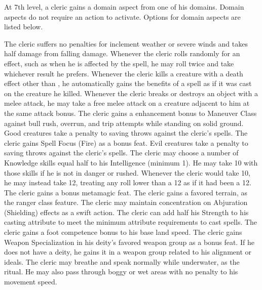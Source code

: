  At 7th level, a cleric gains a domain aspect from one of his domains. Domain aspects do not require an action to activate. Options for domain aspects are listed below.

 The cleric suffers no penalties for inclement weather or severe winds and takes half damage from falling damage.
 Whenever the cleric rolls randomly for an effect, such as when he is affected by the  spell, he may roll twice and take whichever result he prefers.
 Whenever the cleric kills a creature with a death effect other than , he automatically gains the benefits of a  spell as if it was cast on the creature he killed.
 Whenever the cleric breaks or destroys an object with a melee attack, he may take a free melee attack on a creature adjacent to him at the same attack bonus.
 The cleric gains a  enhancement bonus to Maneuver Class against bull rush, overrun, and trip attempts while standing on solid ground.
 Good creatures take a  penalty to saving throws against the cleric's spells.
 The cleric gains Spell Focus (Fire) as a bonus feat.
 Evil creatures take a  penalty to saving throws against the cleric's spells.
 The cleric may choose a number of Knowledge skills equal half to his Intelligence (minimum 1). He may take 10 with those skills if he is not in danger or rushed.
 Whenever the cleric would take 10, he may instead take 12, treating any roll lower than a 12 as if it had been a 12.
 The cleric gains a bonus metamagic feat.
 The cleric gains a favored terrain, as the ranger class feature.
 The cleric may maintain concentration on Abjuration (Shielding) effects as a swift action.
 The cleric can add half his Strength to his casting attribute to meet the minimum attribute requirements to cast spells.
 The cleric gains a  foot competence bonus to his base land speed.
 The cleric gains Weapon Specialization in his deity's favored weapon group as a bonus feat. If he does not have a deity, he gains it in a weapon group related to his alignment or ideals.
 The cleric may breathe and speak normally while underwater, as the  ritual. He may also pass through boggy or wet areas with no penalty to his movement speed.


